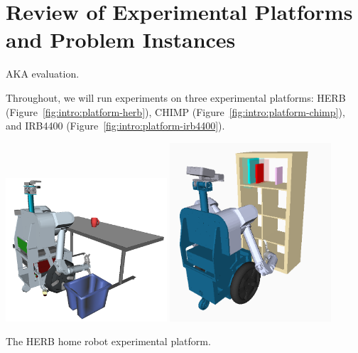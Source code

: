 
\section{Review of Experimental Platforms and Problem Instances}

AKA evaluation.

Throughout, we will run experiments on three experimental platforms:
HERB (Figure~\ref{fig:intro:platform-herb}),
CHIMP (Figure~\ref{fig:intro:platform-chimp}),
and IRB4400 (Figure~\ref{fig:intro:platform-irb4400}).

\begin{marginfigure}
   \centering
   \includegraphics[width=0.45\textwidth]{figs/simple-table-clearing-task.png}
   \includegraphics[width=0.45\textwidth]{figs/herbarm-traj0-t000.png}
   \caption{The HERB home robot experimental platform.}
   \label{fig:intro:platform-herb}
\end{marginfigure}

